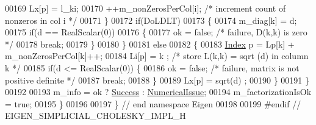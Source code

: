 \begin{DoxyCode}
00169       Lx[p] = l\_ki;
00170       ++m\_nonZerosPerCol[i];              \textcolor{comment}{/* increment count of nonzeros in col i */}
00171     \}
00172     \textcolor{keywordflow}{if}(DoLDLT)
00173     \{
00174       m\_diag[k] = d;
00175       \textcolor{keywordflow}{if}(d == RealScalar(0))
00176       \{
00177         ok = \textcolor{keyword}{false};                         \textcolor{comment}{/* failure, D(k,k) is zero */}
00178         \textcolor{keywordflow}{break};
00179       \}
00180     \}
00181     \textcolor{keywordflow}{else}
00182     \{
00183       \hyperlink{namespace_eigen_a62e77e0933482dafde8fe197d9a2cfde}{Index} p = Lp[k] + m\_nonZerosPerCol[k]++;
00184       Li[p] = k ;                \textcolor{comment}{/* store L(k,k) = sqrt (d) in column k */}
00185       \textcolor{keywordflow}{if}(d <= RealScalar(0)) \{
00186         ok = \textcolor{keyword}{false};              \textcolor{comment}{/* failure, matrix is not positive definite */}
00187         \textcolor{keywordflow}{break};
00188       \}
00189       Lx[p] = sqrt(d) ;
00190     \}
00191   \}
00192 
00193   m\_info = ok ? \hyperlink{group__enums_gga85fad7b87587764e5cf6b513a9e0ee5ea52581b035f4b59c203b8ff999ef5fcea}{Success} : \hyperlink{group__enums_gga85fad7b87587764e5cf6b513a9e0ee5eaaf9b736d310a664e7729d163a035cc5f}{NumericalIssue};
00194   m\_factorizationIsOk = \textcolor{keyword}{true};
00195 \}
00196 
00197 \} \textcolor{comment}{// end namespace Eigen}
00198 
00199 \textcolor{preprocessor}{#endif // EIGEN\_SIMPLICIAL\_CHOLESKY\_IMPL\_H}
\end{DoxyCode}
